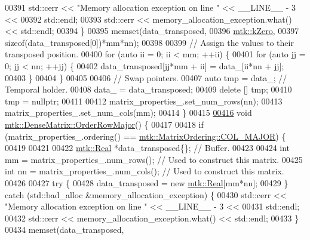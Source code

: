 \begin{DoxyCode}
00391     std::cerr << \textcolor{stringliteral}{"Memory allocation exception on line "} << \_\_LINE\_\_ - 3 <<
00392       std::endl;
00393     std::cerr << memory\_allocation\_exception.what() << std::endl;
00394   \}
00395   memset(data\_transposed,
00396          \hyperlink{group__c01-roots_ga59a451a5fae30d59649bcda274fea271}{mtk::kZero},
00397          \textcolor{keyword}{sizeof}(data\_transposed[0])*mm*nn);
00398 
00399   \textcolor{comment}{// Assign the values to their transposed position.}
00400   \textcolor{keywordflow}{for} (\textcolor{keyword}{auto} ii = 0; ii < mm; ++ii) \{
00401     \textcolor{keywordflow}{for} (\textcolor{keyword}{auto} jj = 0; jj < nn; ++jj) \{
00402       data\_transposed[jj*mm + ii] = data\_[ii*nn + jj];
00403     \}
00404   \}
00405 
00406   \textcolor{comment}{// Swap pointers.}
00407   \textcolor{keyword}{auto} tmp = data\_; \textcolor{comment}{// Temporal holder.}
00408   data\_ = data\_transposed;
00409   \textcolor{keyword}{delete} [] tmp;
00410   tmp = \textcolor{keyword}{nullptr};
00411 
00412   matrix\_properties\_.set\_num\_rows(nn);
00413   matrix\_properties\_.set\_num\_cols(mm);
00414 \}
00415 
\hypertarget{mtk__dense__matrix_8cc_source_l00416}{}\hyperlink{classmtk_1_1DenseMatrix_ac2949efba3e8278335d45418c85433e4}{00416} \textcolor{keywordtype}{void} \hyperlink{classmtk_1_1DenseMatrix_ac2949efba3e8278335d45418c85433e4}{mtk::DenseMatrix::OrderRowMajor}() \{
00417 
00418   \textcolor{keywordflow}{if} (matrix\_properties\_.ordering() == \hyperlink{namespacemtk_ga622801bd9f912d0f976c3e383f5f581ca34d2765ffc490951febdcca04bc4f7cd}{mtk::MatrixOrdering::COL\_MAJOR}) \{
00419 
00421 
00422     \hyperlink{group__c01-roots_gac080bbbf5cbb5502c9f00405f894857d}{mtk::Real} *data\_transposed\{\}; \textcolor{comment}{// Buffer.}
00423 
00424     \textcolor{keywordtype}{int} mm = matrix\_properties\_.num\_rows(); \textcolor{comment}{// Used to construct this matrix.}
00425     \textcolor{keywordtype}{int} nn = matrix\_properties\_.num\_cols(); \textcolor{comment}{// Used to construct this matrix.}
00426 
00427     \textcolor{keywordflow}{try} \{
00428       data\_transposed = \textcolor{keyword}{new} \hyperlink{group__c01-roots_gac080bbbf5cbb5502c9f00405f894857d}{mtk::Real}[mm*nn];
00429     \} \textcolor{keywordflow}{catch} (std::bad\_alloc &memory\_allocation\_exception) \{
00430       std::cerr << \textcolor{stringliteral}{"Memory allocation exception on line "} << \_\_LINE\_\_ - 3 <<
00431         std::endl;
00432       std::cerr << memory\_allocation\_exception.what() << std::endl;
00433     \}
00434     memset(data\_transposed,

\end{DoxyCode}
